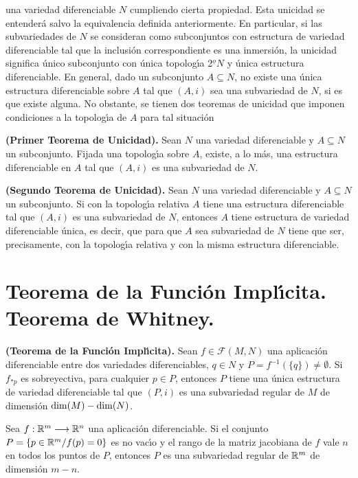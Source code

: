 \documentclass[cursovd_portada.tex]{subfiles}
\begin{document}
una variedad diferenciable $N$ cumpliendo cierta propiedad. Esta
unicidad se entender\'{a} salvo la equivalencia definida
anteriormente. En particular, si las subvariedades de $N$ se
consideran como subconjuntos con estructura de variedad
diferenciable tal que la inclusi\'{o}n correspondiente es una
inmersi\'{o}n, la unicidad significa \'{u}nico subconjunto con
\'{u}nica topolog\'{\i}a 2$^{\underline{o}}N$ y \'{u}nica
estructura diferenciable. En general, dado un subconjunto
$A\subseteq N$, no existe una \'{u}nica estructura diferenciable
sobre $A$ tal que $(A,i)$ sea una subvariedad de $N$, si es que
existe alguna. No obstante, se tienen dos teoremas de unicidad que
imponen condiciones a la topolog\'{\i}a de $A$ para tal
situaci\'{o}n
\begin{teorema}
{\bf (Primer Teorema de Unicidad).} Sean $N$ una variedad
diferenciable y $A\subseteq N$ un subconjunto. Fijada una
topolog\'{\i}a sobre $A$, existe, a lo m\'{a}s, una estructura
diferenciable en $A$ tal que $(A,i)$ es una subvariedad de $N$.
\end{teorema}
\begin{teorema}
{\bf (Segundo Teorema de Unicidad).} Sean $N$ una variedad
diferenciable y $A\subseteq N$ un subconjunto. Si con la
topolog\'{\i}a relativa $A$ tiene una estructura diferenciable tal
que $(A,i)$ es una subvariedad de $N$, entonces $A$ tiene
estructura de variedad diferenciable \'{u}nica, es decir, que para
que $A$ sea subvariedad de $N$ tiene que ser, precisamente, con la
topolog\'{\i}a relativa y con la misma estructura diferenciable.
\end{teorema}
\section{Teorema de la Funci\'{o}n Impl\'{\i}cita. Teorema de Whitney.}
\begin{teorema}
{\bf (Teorema de la Funci\'{o}n Impl\'{\i}cita).} Sean
$f\in\mathcal{F}(M,N)$ una aplicaci\'{o}n diferenciable entre dos
variedades diferenciables, $q\in N$ y
$P=f^{-1}(\{q\})\neq\emptyset$. Si $f_{*p}$ es sobreyectiva, para
cualquier $p\in P$, entonces $P$ tiene una \'{u}nica estructura de
variedad diferenciable tal que $(P,i)$ es una subvariedad regular
de $M$ de dimensi\'{o}n ${\rm dim}(M)-{\rm dim}(N)$.
\end{teorema}
\begin{coro} Sea $f:\mathbb{R}^m\longrightarrow\mathbb{R}^n$ una aplicaci\'{o}n
diferenciable. Si el conjunto $P=\{p\in\mathbb{R}^m/f(p)=0\}$ es no
vac\'{\i}o y el rango de la matriz jacobiana de $f$ vale $n$ en
todos los puntos de $P$, entonces $P$ es una subvariedad regular
de $\mathbb{R}^m$ de dimensi\'{o}n $m-n$.
\end{coro}
\end{document}
